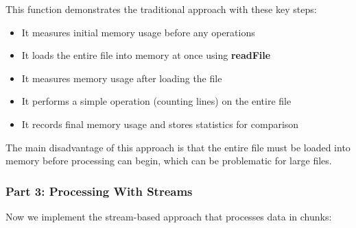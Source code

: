 \documentclass[12pt,letterpaper]{article}
\begin{document}
This function demonstrates the traditional approach with these key steps:
\begin{itemize}
    \item It measures initial memory usage before any operations
    \item It loads the entire file into memory at once using \textbf{\textcolor{accentColor}{readFile}}
    \item It measures memory usage after loading the file
    \item It performs a simple operation (counting lines) on the entire file
    \item It records final memory usage and stores statistics for comparison
\end{itemize}

The main disadvantage of this approach is that the entire file must be loaded into memory before processing can begin, which can be problematic for large files.

\subsubsection{Part 3: Processing With Streams}

Now we implement the stream-based approach that processes data in chunks:
\end{document}
